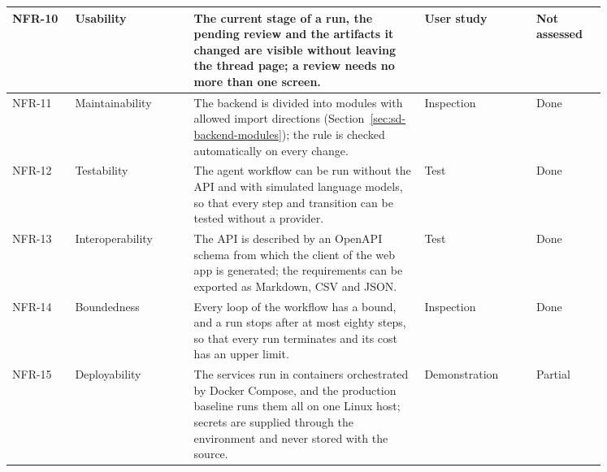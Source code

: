 \begin{longtable}{|p{0.09\linewidth}|p{0.17\linewidth}|p{0.33\linewidth}|p{0.16\linewidth}|p{0.1\linewidth}|}
    NFR-10 & Usability & The current stage of a run, the pending review and the artifacts it changed are visible without leaving the thread page; a review needs no more than one screen. & User study & Not assessed \\ \hline
    NFR-11 & Maintainability & The backend is divided into modules with allowed import directions (Section~\ref{sec:sd-backend-modules}); the rule is checked automatically on every change. & Inspection & Done \\ \hline
    NFR-12 & Testability & The agent workflow can be run without the API and with simulated language models, so that every step and transition can be tested without a provider. & Test & Done \\ \hline
    NFR-13 & Interoperability & The API is described by an OpenAPI schema from which the client of the web app is generated; the requirements can be exported as Markdown, CSV and JSON. & Test & Done \\ \hline
    NFR-14 & Boundedness & Every loop of the workflow has a bound, and a run stops after at most eighty steps, so that every run terminates and its cost has an upper limit. & Inspection & Done \\ \hline
    NFR-15 & Deployability & The services run in containers orchestrated by Docker Compose, and the production baseline runs them all on one Linux host; secrets are supplied through the environment and never stored with the source. & Demonstration & Partial \\ \hline
\end{longtable}
\endgroup
